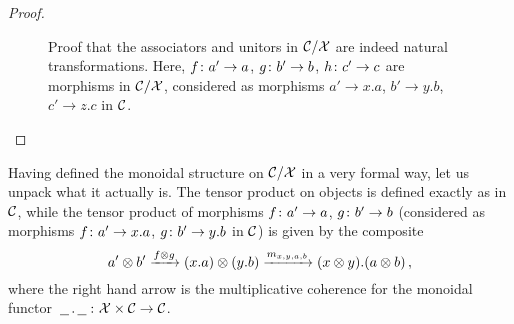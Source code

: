 \begin{proof}
\begin{figure}
    \caption[Proof that the associators and unitors in $\C/\X$ are indeed natural transformations.]{Proof that the associators and unitors in $\C/\X$ are indeed natural transformations.  
    Here, $f\colon a'\to a$, $g\colon b' \to b$, $h\colon c'\to c$ are morphisms in $\C/\X$, considered as morphisms $a'\to x.a$, $b'\to y.b$, $c'\to z.c$ in ${\mathcal{C}}$.}
    \label{FigAssocUnitorNaturalTransformations}
  \end{figure}
\end{proof}

Having defined the monoidal structure on $\C/\X$ in a very formal way, let us unpack what it actually is.  
The tensor product on objects is defined exactly as in ${\mathcal{C}}$, while the tensor product of morphisms $f\colon a' \to a$, $g \colon b' \to b$ (considered as morphisms $f \colon a' \to x.a$, $g\colon b'\to y.b$ in ${\mathcal{C}}$) is given by the composite
\[
  a'\otimes b' \xrightarrow{f\otimes g}
  (x.a) \otimes (y.b) \xrightarrow{m_{x,y,a,b}}
  (x\otimes y).(a\otimes b)\,,
  \]
where the right hand arrow is the multiplicative coherence for the monoidal functor $\,\underline{\hspace{1.5ex}}\,.\,\underline{\hspace{1.5ex}}\,\colon \mathcal X \times {\mathcal{C}} \to {\mathcal{C}}$.

